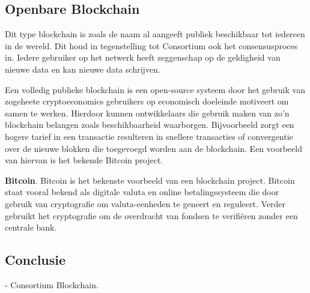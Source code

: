 \subsection{Openbare Blockchain}
Dit type blockchain is zoals de naam al aangeeft publiek beschikbaar tot iedereen in de wereld. Dit houd in tegenstelling tot Consortium ook het consensusproces in. Iedere gebruiker op het netwerk heeft zeggenschap op de geldigheid van nieuwe data en kan nieuwe data schrijven. \par

Een volledig publieke blockchain is een open-source systeem door het gebruik van zogeheete cryptoeconomics gebruikers op economisch doeleinde motiveert om samen te werken. Hierdoor kunnen ontwikkelaars die gebruik maken van zo'n blockchain belangen zoals beschikbaarheid waarborgen. Bijvoorbeeld zorgt een hogere tarief in een transactie resulteren in snellere transacties of convergentie over de nieuwe blokken die toegevoegd worden aan de blockchain. Een voorbeeld van hiervan is het bekende Bitcoin project.

\textbf{Bitcoin}. Bitcoin is het bekenste voorbeeld van een blockchain project. Bitcoin staat vooral bekend als digitale valuta en online betalingssysteem die door gebruik van cryptografie om valuta-eenheden te geneert en reguleert. Verder gebruikt het cryptografie om de overdracht van fondsen te verifiëren zonder een centrale bank. \par

\subsection{Conclusie}
- Consortium Blockchain.

\newpage